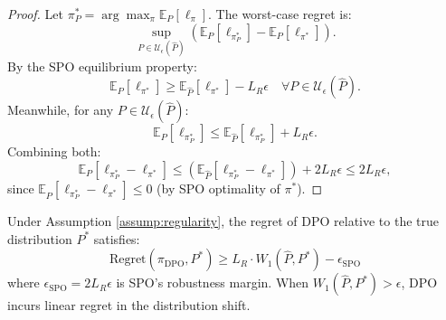 \begin{proof}
Let \( \pi_P^* = \arg\max_\pi \mathbb{E}_P[\ell_\pi] \). The worst-case regret is:
\[
\sup_{P \in \mathcal{U}_\epsilon(\hat{P})} \left( \mathbb{E}_P[\ell_{\pi_P^*}] - \mathbb{E}_P[\ell_{\pi^*}] \right).
\]
By the SPO equilibrium property:
\[
\mathbb{E}_P[\ell_{\pi^*}] \geq \mathbb{E}_{\hat{P}}[\ell_{\pi^*}] - L_R \epsilon \quad \forall P \in \mathcal{U}_\epsilon(\hat{P}).
\]
Meanwhile, for any \( P \in \mathcal{U}_\epsilon(\hat{P}) \):
\[
\mathbb{E}_P[\ell_{\pi_P^*}] \leq \mathbb{E}_{\hat{P}}[\ell_{\pi_P^*}] + L_R \epsilon.
\]
Combining both:
\[
\mathbb{E}_P[\ell_{\pi_P^*} - \ell_{\pi^*}] \leq \left( \mathbb{E}_{\hat{P}}[\ell_{\pi_P^*} - \ell_{\pi^*}] \right) + 2L_R \epsilon \leq 2L_R \epsilon,
\]
since \( \mathbb{E}_{\hat{P}}[\ell_{\pi_P^*} - \ell_{\pi^*}] \leq 0 \) (by SPO optimality of \( \pi^* \)).
\end{proof}

\begin{theorem}
\label{thm:dpo_suboptimal}
Under Assumption \ref{assump:regularity}, the regret of DPO relative to the true distribution \( P^* \) satisfies:
\[
\text{Regret}(\pi_{\text{DPO}}, P^*) \geq L_R \cdot W_1(\hat{P}, P^*) - \epsilon_{\text{SPO}}
\]
where \( \epsilon_{\text{SPO}} = 2L_R\epsilon \) is SPO's robustness margin. When \( W_1(\hat{P}, P^*) > \epsilon \), DPO incurs linear regret in the distribution shift.
\end{theorem}

